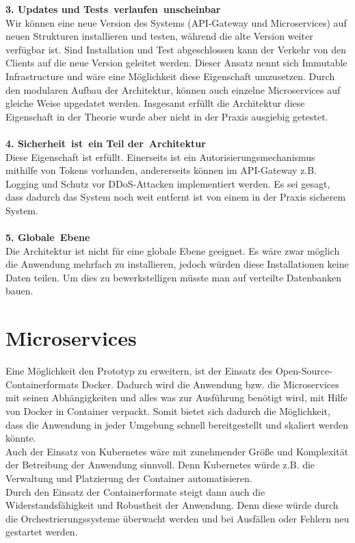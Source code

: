 \textbf{3. Updates und Tests verlaufen unscheinbar}\\
Wir können eine neue Version des Systems (API-Gateway und Microservices) auf neuen Strukturen installieren und testen, während die alte Version weiter verfügbar ist. Sind Installation und Test abgeschlossen kann der Verkehr von den Clients auf die neue Version geleitet werden. Dieser Ansatz nennt sich Immutable Infrastructure und wäre eine Möglichkeit diese Eigenschaft umzusetzen. Durch den modularen Aufbau der Architektur, können auch einzelne Microservices auf gleiche Weise upgedatet werden. Insgesamt erfüllt die Architektur diese Eigenschaft in der Theorie wurde aber nicht in der Praxis ausgiebig getestet.\\
\\
\textbf{4. Sicherheit ist ein Teil der Architektur}\\
Diese Eigenschaft ist erfüllt. Einerseits ist ein Autorisierungsmechanismus mithilfe von Tokens vorhanden, andererseits können im API-Gateway z.B. Logging und Schutz vor DDoS-Attacken implementiert werden. Es sei gesagt, dass dadurch das System noch weit entfernt ist von einem in der Praxis sicherem System.\\
\\
\textbf{5. Globale Ebene}\\
Die Architektur ist nicht für eine globale Ebene geeignet. Es wäre zwar möglich die Anwendung mehrfach zu installieren, jedoch würden diese Installationen keine Daten teilen. Um dies zu bewerkstelligen müsste man auf verteilte Datenbanken bauen.

\section{Microservices}
Eine Möglichkeit den Prototyp zu erweitern, ist der Einsatz des Open-Source-Containerformats Docker. Dadurch wird die Anwendung  bzw. die Microservices mit seinen Abhängigkeiten und alles was zur Ausführung benötigt wird, mit Hilfe von Docker in Container verpackt. Somit bietet sich dadurch die Möglichkeit, dass die Anwendung in jeder Umgebung schnell bereitgestellt und skaliert werden könnte.\\
Auch der Einsatz von Kubernetes wäre mit zunehmender Größe und Komplexität der Betreibung der Anwendung sinnvoll. Denn Kubernetes würde z.B. die Verwaltung und Platzierung der Container automatisieren.\\
Durch den Einsatz der Containerformate steigt dann auch die Widerstandsfähigkeit und Robustheit der Anwendung. Denn diese würde durch die Orchestrierungssysteme überwacht werden und bei Ausfällen oder Fehlern neu gestartet werden.
 
